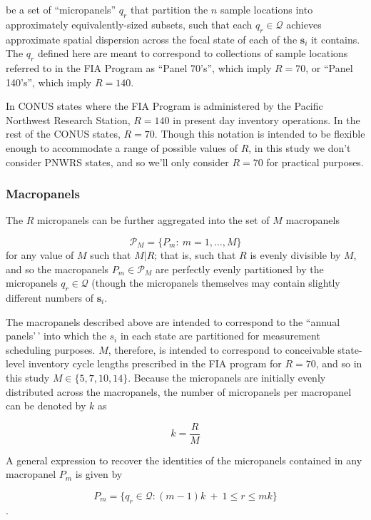 \documentclass[
  number]{elsarticle}
\begin{document}
be a set of ``micropanels'' \(q_r\) that partition the \(n\) sample
locations into approximately equivalently-sized subsets, such that each
\(q_r \in \mathcal{Q}\) achieves approximate spatial dispersion across
the focal state of each of the \(\mathbf{s}_i\) it contains. The \(q_r\)
defined here are meant to correspond to collections of sample locations
referred to in the FIA Program as ``Panel 70's'', which imply
\(R = 70\), or ``Panel 140's'', which imply \(R = 140\).

In CONUS states where the FIA Program is administered by the Pacific
Northwest Research Station, \(R = 140\) in present day inventory
operations. In the rest of the CONUS states, \(R = 70\). Though this
notation is intended to be flexible enough to accommodate a range of
possible values of \(R\), in this study we don't consider PNWRS states,
and so we'll only consider \(R = 70\) for practical purposes.

\subsubsection{Macropanels}\label{macropanels}

The \(R\) micropanels can be further aggregated into the set of \(M\)
macropanels

\[\mathcal{P}_M = \{P_m : \ m = 1,\ldots,M\}\] for any value of \(M\)
such that \(M \vert R\); that is, such that \(R\) is evenly divisible by
\(M\), and so the macropanels \(P_m \in \mathcal{P}_M\) are perfectly
evenly partitioned by the micropanels \(q_r \in \mathcal{Q}\) (though
the micropanels themselves may contain slightly different numbers of
\(\mathbf{s}_i\).

The macropanels described above are intended to correspond to the
``annual panels'\,' into which the \(s_i\) in each state are partitioned
for measurement scheduling purposes. \(M\), therefore, is intended to
correspond to conceivable state-level inventory cycle lengths prescribed
in the FIA program for \(R = 70\), and so in this study
\(M \in \{5, 7, 10, 14\}\). Because the micropanels are initially evenly
distributed across the macropanels, the number of micropanels per
macropanel can be denoted by \(k\) as

\[k = \frac{R}{M}\]

A general expression to recover the identities of the micropanels
contained in any macropanel \(P_m\) is given by

\[P_m = \{ q_r \in \mathcal{Q} : (m - 1) k \ + \ 1 \leq r \leq m k \}\].
\end{document}
